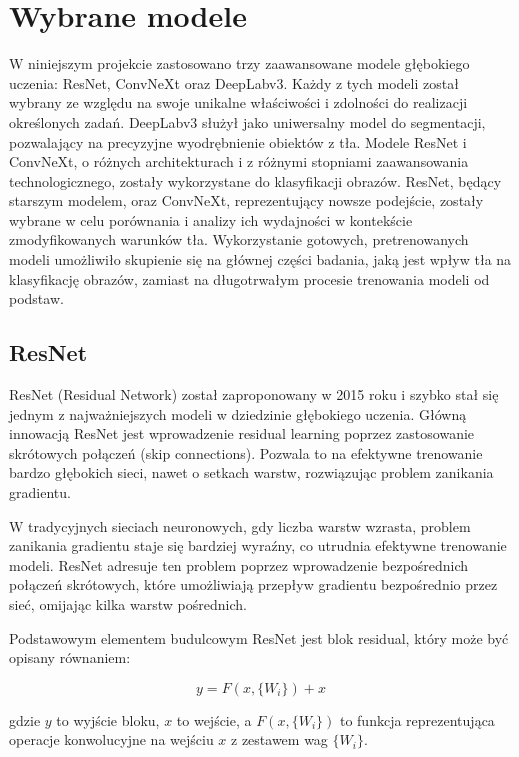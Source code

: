 \section*{Wybrane modele}

W niniejszym projekcie zastosowano trzy zaawansowane modele głębokiego uczenia: ResNet, ConvNeXt oraz DeepLabv3. 
Każdy z tych modeli został wybrany ze względu na swoje unikalne właściwości i zdolności do realizacji określonych zadań. 
DeepLabv3 służył jako uniwersalny model do segmentacji, pozwalający na precyzyjne wyodrębnienie obiektów z tła. 
Modele ResNet i ConvNeXt, o różnych architekturach i z różnymi stopniami zaawansowania technologicznego, zostały 
wykorzystane do klasyfikacji obrazów. ResNet, będący starszym modelem, oraz ConvNeXt, reprezentujący nowsze podejście, 
zostały wybrane w celu porównania i analizy ich wydajności w kontekście zmodyfikowanych warunków tła. Wykorzystanie 
gotowych, pretrenowanych modeli umożliwiło skupienie się na głównej części badania, jaką jest wpływ tła na klasyfikację 
obrazów, zamiast na długotrwałym procesie trenowania modeli od podstaw.

\subsection*{ResNet}

ResNet (Residual Network) został zaproponowany w 2015 roku i szybko stał się jednym z najważniejszych modeli w 
dziedzinie głębokiego uczenia. Główną innowacją ResNet jest wprowadzenie residual learning poprzez zastosowanie 
skrótowych połączeń (skip connections). Pozwala to na efektywne trenowanie bardzo głębokich sieci, nawet o setkach 
warstw, rozwiązując problem zanikania gradientu.

W tradycyjnych sieciach neuronowych, gdy liczba warstw wzrasta, problem zanikania gradientu staje się bardziej wyraźny, 
co utrudnia efektywne trenowanie modeli. ResNet adresuje ten problem poprzez wprowadzenie bezpośrednich połączeń 
skrótowych, które umożliwiają przepływ gradientu bezpośrednio przez sieć, omijając kilka warstw pośrednich.

Podstawowym elementem budulcowym ResNet jest blok residual, który może być opisany równaniem:

\begin{equation}
    y = F(x, \{W_i\}) + x
\end{equation}

gdzie \( y \) to wyjście bloku, \( x \) to wejście, a \( F(x, \{W_i\}) \) to funkcja reprezentująca operacje 
konwolucyjne na wejściu \( x \) z zestawem wag \( \{W_i\} \).

